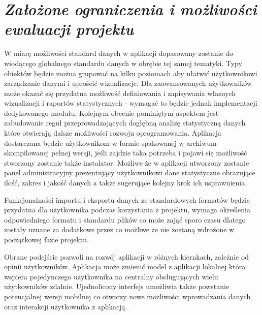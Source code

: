 \documentclass[a4paper,10pt, twoside]{report}
\newcommand{\customstylechapter}[1]{\large{\textit{#1}}}
\begin{document}

\chapter{\customstylechapter{Założone ograniczenia i możliwości ewaluacji projektu}}
{W miarę możliwości standard danych w aplikacji dopasowany zostanie do wiodącego
 globalnego standardu danych w obrębie tej samej tematyki. Typy obiektów będzie
 można grupować na kilku poziomach aby ułatwić użytkownikowi zarządzanie danymi
 i uprościć wizualizacje. Dla zaawansowanych użytkowników może okazać się 
przydatna możliwość definiowania i zapisywania własnych wizualizacji i raportów 
statystycznych - wymagać to będzie jednak implementacji dedykowanego modułu. 
Kolejnym obecnie pominiętym aspektem jest zabudowanie reguł przeprowadzających 
dogłębną analizę statystyczną danych które otwierają dalsze możliwości rozwoju 
oprogramowania. Aplikacja dostarczana będzie użytkownikom w formie spakowanej w
archiwum skompilowanej pełnej wersji, jeśli zajdzie taka potrzeba i pojawi się 
możliwość stworzony zostanie także instalator. Możliwe że w aplikacji utworzony 
zostanie panel administracyjny prezentujący użytkownikowi dane statystyczne 
obrazujące ilość, zakres i jakość danych a także sugerujące kolejny krok ich 
usprawnienia.}

{Funkcjonalności importu i eksportu danych ze standardowych formatów będzie 
przydatna dla użytkownika podczas korzystania z projektu, wymaga określenia 
odpowiedniego formatu i standardu plików co może zająć sporo czasu dlatego 
zostały uznane za dodatkowe przez co możliwe że nie zostaną wdrożone w 
początkowej fazie projektu.}

{Obrane podejście pozwoli na rozwój aplikacji w różnych kiernkach, zależnie od 
opinii użytkowników. Aplikacja może zmienić model z aplikacji lokalnej która 
wspiera pojedynczego użytkownika na centralny obsługujących wielu użytkowników 
zdalnie. Ujednolicony interfejs umożliwia także powstanie potencjalnej wersji 
mobilnej co otworzy nowe możliwości wprowadzania danych oraz interakcji 
użytkownika z aplikacją.}
\end{document}

